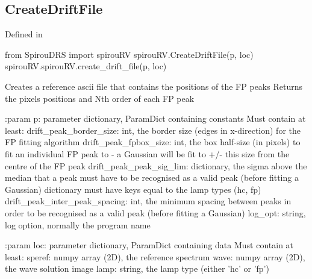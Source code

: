 \noindent\begin{minipage}{\textwidth}
\subsection{CreateDriftFile}

Defined in \spirouRV{}

\begin{pythonbox}
from SpirouDRS import spirouRV
spirouRV.CreateDriftFile(p, loc)
spirouRV.spirouRV.create_drift_file(p, loc)
\end{pythonbox}

\begin{pythondocstring}
Creates a reference ascii file that contains the positions of the FP peaks
Returns the pixels positions and Nth order of each FP peak

:param p: parameter dictionary, ParamDict containing constants
    Must contain at least:
            drift_peak_border_size: int, the border size (edges in
                                    x-direction) for the FP fitting
                                    algorithm
            drift_peak_fpbox_size: int, the box half-size (in pixels) to
                                   fit an individual FP peak to - a
                                   Gaussian will be fit to +/- this size
                                   from the centre of the FP peak
            drift_peak_peak_sig_lim: dictionary, the sigma above the median
                                     that a peak must have to be recognised
                                     as a valid peak (before fitting a
                                     Gaussian) dictionary must have keys
                                     equal to the lamp types (hc, fp)
            drift_peak_inter_peak_spacing: int, the minimum spacing between
                                           peaks in order to be recognised
                                           as a valid peak (before fitting
                                           a Gaussian)
            log_opt: string, log option, normally the program name

:param loc: parameter dictionary, ParamDict containing data
        Must contain at least:
            speref: numpy array (2D), the reference spectrum
            wave: numpy array (2D), the wave solution image
            lamp: string, the lamp type (either 'hc' or 'fp')


\end{pythondocstring}
\end{minipage}
